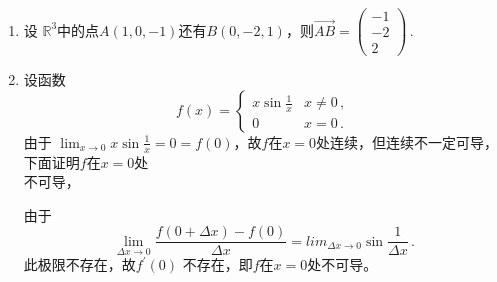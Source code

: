 \documentclass[draft,14pt]{extarticle}%
\begin{document}
\begin{enumerate}
    \begin{equation*}
        \mathscr{A}(\bm\alpha+\bm\beta)=\mathscr{A}(\bm\alpha)+\mathscr{A}(\bm\beta),
        \mathscr{A}(k\bm\alpha)=k\mathscr{A}(\bm\alpha)\,.
    \end{equation*}
    \item 设 $\mathbb{R}^3$中的点$A(1,0,-1)$还有$B(0,-2,1)$，则$\overrightarrow{AB}=%
    \begin{pmatrix}
    -1\\
    -2\\
    2
    \end{pmatrix}$\,.
    \item 设函数
    \begin{equation*}
        f(x)=\begin{cases}
        x\sin \frac{1}{x} &x\neq 0\,,\\
        0 &x=0 \,.%
        \end{cases}
    \end{equation*}
    由于 $\displaystyle\lim_{x\to 0}x\sin \frac{1}{x}=0=f(0)$，故$f$在$x=0$处连续，但连续不一定可导，下面证明$f$在$x=0$处\\[5pt]不可导，
    
    由于
    \begin{equation*}
        \lim_{\Delta x\to 0}\frac{f(0+\Delta x)-f(0)}{\Delta x}=lim_{\Delta x\to 0}\sin\frac{1}{\Delta x}\,.
    \end{equation*}
    此极限不存在，故$f^\prime(0)$ 不存在，即$f$在$x=0$处不可导。
\end{enumerate}

\newpage
\nocite{*}%
\end{document}
